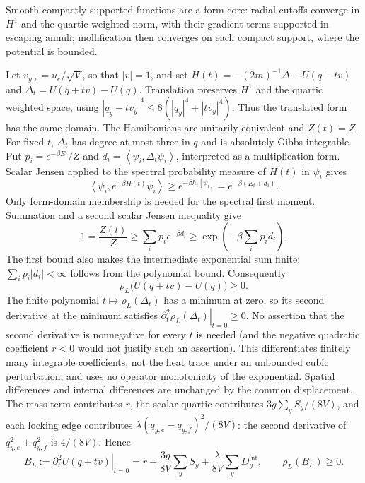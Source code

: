 \documentclass[11pt]{article}
\numberwithin{equation}{section}
\theoremstyle{definition}
\newcommand{\ip}[2]{\left\langle#1,#2\right\rangle}
\begin{document}
Smooth compactly supported functions are a form core: radial cutoffs converge
in $H^1$ and the quartic weighted norm, with their gradient terms supported in
escaping annuli; mollification then converges on each compact support, where
the potential is bounded.

Let $v_{y,e}=u_e/\sqrt V$, so that $|v|=1$, and set
$H(t)=-(2m)^{-1}\Delta+U(q+tv)$ and $\Delta_t=U(q+tv)-U(q)$.
Translation preserves $H^1$ and the quartic weighted space, using
$|q_y-tv_y|^4\leq8(|q_y|^4+|tv_y|^4)$.  Thus the translated form has the
same domain.  The Hamiltonians are unitarily equivalent and $Z(t)=Z$.
For fixed $t$, $\Delta_t$ has degree at most three in $q$ and is
absolutely Gibbs integrable.  Put $p_i=e^{-\beta E_i}/Z$ and
$d_i=\ip{\psi_i}{\Delta_t\psi_i}$, interpreted as a multiplication form.
Scalar Jensen applied to the spectral probability measure of $H(t)$ in
$\psi_i$ gives
\[
 \ip{\psi_i}{e^{-\beta H(t)}\psi_i}
 \geq e^{-\beta h_t[\psi_i]}=e^{-\beta(E_i+d_i)}.
\]
Only form-domain membership is needed for the spectral first moment.
Summation and a second scalar Jensen inequality give
\begin{equation}
 1=\frac{Z(t)}Z\geq\sum_i p_i e^{-\beta d_i}
       \geq\exp\left(-\beta\sum_i p_i d_i\right).
 \label{eq:collective-jensen-chain}
\end{equation}
The first bound also makes the intermediate exponential sum finite;
$\sum_i p_i|d_i|<\infty$ follows from the polynomial bound.  Consequently
\begin{equation}
 \rho_L\big(U(q+tv)-U(q)\big)\geq0. \label{eq:jensen-shift}
\end{equation}
The finite polynomial $t\mapsto\rho_L(\Delta_t)$ has a minimum at zero,
so its second derivative at the minimum satisfies
\(\left.\partial_t^2\rho_L(\Delta_t)\right|_{t=0}\geq0\).
No assertion that the second derivative is nonnegative for every $t$ is
needed (and the negative quadratic coefficient $r<0$ would not justify such
an assertion).  This differentiates finitely many integrable coefficients,
not the heat trace under an unbounded cubic perturbation, and uses no operator
monotonicity of the exponential.
Spatial differences and internal differences are unchanged by the common
displacement.  The mass term contributes $r$, the scalar quartic contributes
$3g\sum_y S_y/(8V)$, and each locking edge contributes
$\lambda(q_{y,e}-q_{y,f})^2/(8V)$: the second derivative of
$q_{y,e}^2+q_{y,f}^2$ is $4/(8V)$.  Hence
\begin{equation}
 B_L:=\left.\partial_t^2U(q+tv)\right|_{t=0}
 =r+\frac{3g}{8V}\sum_yS_y
       +\frac\lambda{8V}\sum_yD_y^{\mathrm{int}},\qquad
 \rho_L(B_L)\geq0. \label{eq:collective-hessian}
\end{equation}
\end{document}
